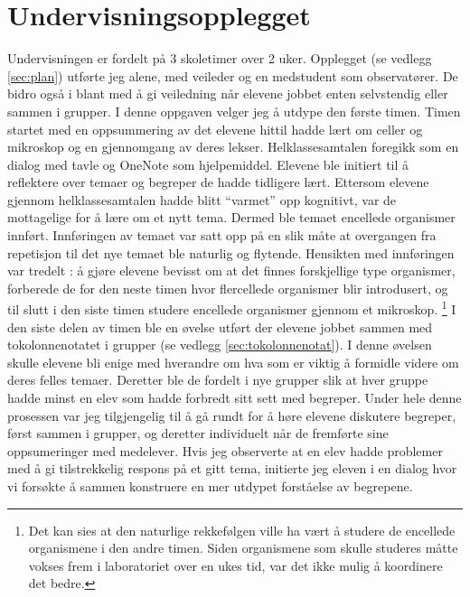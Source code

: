 \documentclass[main.tex]{subfiles}
\begin{document}
\section*{Undervisningsopplegget}
\label{sec:1}
Undervisningen er fordelt på 3 skoletimer over 2 uker. Opplegget (se vedlegg \ref{sec:plan}) 
utførte jeg alene, med veileder og en medstudent som observatører. De bidro også i blant 
med å gi veiledning når elevene jobbet enten selvstendig eller sammen i grupper. I denne 
oppgaven velger jeg å utdype den første timen. 
\newline
\newline
Timen startet med en oppsummering av det elevene hittil hadde lært om celler og mikroskop og en 
gjennomgang av deres lekser. Helklassesamtalen foregikk som en dialog med tavle og OneNote som hjelpemiddel. 
Elevene ble initiert til å reflektere over temaer og begreper de hadde tidligere lært. Ettersom elevene gjennom 
helklassesamtalen hadde blitt ``varmet'' opp kognitivt, var de mottagelige for å lære om et nytt tema. 
Dermed ble temaet encellede organismer innført. Innføringen av temaet var satt opp på en slik 
måte at overgangen fra repetisjon til det nye temaet ble naturlig og flytende. Hensikten med 
innføringen var tredelt : å gjøre elevene bevisst om at det finnes forskjellige type organismer, 
forberede de for den neste timen hvor flercellede organismer blir introdusert, og 
til slutt i den siste timen studere encellede organismer gjennom et mikroskop. \footnote[2]{Det kan sies 
at den naturlige rekkefølgen ville ha vært å studere de encellede organismene i den andre timen. 
Siden organismene som skulle studeres måtte vokses frem i laboratoriet over en ukes tid, var det ikke 
mulig å koordinere det bedre.}
\newline
\newline
I den siste delen av timen ble en øvelse utført der elevene jobbet sammen med tokolonnenotatet i 
grupper (se vedlegg \ref{sec:tokolonnenotat}). I denne øvelsen skulle elevene bli enige med hverandre om hva som er 
viktig å formidle videre om deres felles temaer. Deretter ble de fordelt i nye grupper slik at hver 
gruppe hadde minst en elev som hadde forbredt sitt sett med begreper. Under hele denne prosessen var jeg 
tilgjengelig til å gå rundt for å høre elevene diskutere begreper, først sammen i grupper, og 
deretter individuelt når de fremførte sine oppsumeringer med medelever. Hvis jeg observerte at en 
elev hadde problemer med å gi tilstrekkelig respons på et gitt tema, initierte jeg eleven i en dialog 
hvor vi forsøkte å sammen konstruere en mer utdypet forståelse av begrepene.
\end{document}
